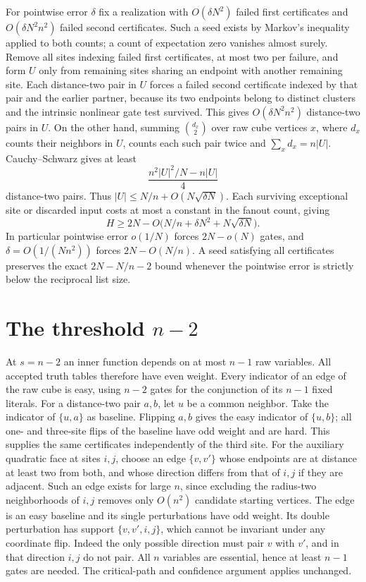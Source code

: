 \documentclass[11pt]{article}
\begin{document}
For pointwise error \(\delta\) fix a realization with \(O(\delta N^2)\) failed first certificates and \(O(\delta N^2n^2)\) failed second certificates. Such a seed exists by Markov's inequality applied to both counts; a count of expectation zero vanishes almost surely. Remove all sites indexing failed first certificates, at most two per failure, and form \(U\) only from remaining sites sharing an endpoint with another remaining site. Each distance-two pair in \(U\) forces a failed second certificate indexed by that pair and the earlier partner, because its two endpoints belong to distinct clusters and the intrinsic nonlinear gate test survived. This gives \(O(\delta N^2n^2)\) distance-two pairs in \(U\). On the other hand, summing \(\binom{d_x}2\) over raw cube vertices \(x\), where \(d_x\) counts their neighbors in \(U\), counts each such pair twice and \(\sum_x d_x=n|U|\). Cauchy--Schwarz gives at least
\[
 \frac{n^2|U|^2/N-n|U|}{4}
\]
distance-two pairs. Thus \(|U|\le N/n+O(N\sqrt{\delta N})\). Each surviving exceptional site or discarded input costs at most a constant in the fanout count, giving
\[
 H\ge2N-O\bigl(N/n+\delta N^2+N\sqrt{\delta N}\bigr).
\]
In particular pointwise error \(o(1/N)\) forces \(2N-o(N)\) gates, and \(\delta=O(1/(Nn^2))\) forces \(2N-O(N/n)\). A seed satisfying all certificates preserves the exact \(2N-N/n-2\) bound whenever the pointwise error is strictly below the reciprocal list size.

\section{The threshold \(n-2\)}

At \(s=n-2\) an inner function depends on at most \(n-1\) raw variables. All accepted truth tables therefore have even weight. Every indicator of an edge of the raw cube is easy, using \(n-2\) gates for the conjunction of its \(n-1\) fixed literals. For a distance-two pair \(a,b\), let \(u\) be a common neighbor. Take the indicator of \(\{u,a\}\) as baseline. Flipping \(a,b\) gives the easy indicator of \(\{u,b\}\); all one- and three-site flips of the baseline have odd weight and are hard. This supplies the same certificates independently of the third site. For the auxiliary quadratic face at sites \(i,j\), choose an edge \(\{v,v'\}\) whose endpoints are at distance at least two from both, and whose direction differs from that of \(i,j\) if they are adjacent. Such an edge exists for large \(n\), since excluding the radius-two neighborhoods of \(i,j\) removes only \(O(n^2)\) candidate starting vertices. The edge is an easy baseline and its single perturbations have odd weight. Its double perturbation has support \(\{v,v',i,j\}\), which cannot be invariant under any coordinate flip. Indeed the only possible direction must pair \(v\) with \(v'\), and in that direction \(i,j\) do not pair. All \(n\) variables are essential, hence at least \(n-1\) gates are needed. The critical-path and confidence argument applies unchanged.
\end{document}
